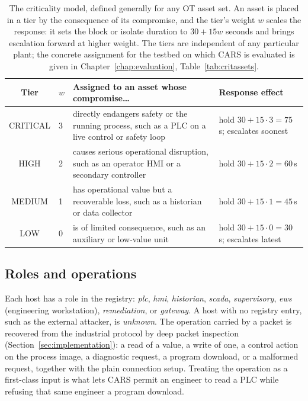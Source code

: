 \begin{table}[t]
\centering
\begin{tabular}{clp{}l}
\hline
Tier & $w$ & Assigned to an asset whose compromise\ldots & Response effect \\
\hline
CRITICAL & 3 & directly endangers safety or the running process, such as a PLC on a live control or safety loop & hold $30{+}15{\cdot}3=75$\,s; escalates soonest \\
HIGH & 2 & causes serious operational disruption, such as an operator HMI or a secondary controller & hold $30{+}15{\cdot}2=60$\,s \\
MEDIUM & 1 & has operational value but a recoverable loss, such as a historian or data collector & hold $30{+}15{\cdot}1=45$\,s \\
LOW & 0 & is of limited consequence, such as an auxiliary or low-value unit & hold $30{+}15{\cdot}0=30$\,s; escalates latest \\
\hline
\end{tabular}
\caption[The criticality model]{The criticality model, defined generally for any OT asset set. An asset is placed in a tier by the consequence of its compromise, and the tier's weight $w$ scales the response: it sets the block or isolate duration to $30+15w$ seconds and brings escalation forward at higher weight. The tiers are independent of any particular plant; the concrete assignment for the testbed on which CARS is evaluated is given in Chapter~\ref{chap:evaluation}, Table~\ref{tab:critassets}.}
\label{tab:criticality}
\end{table}

\subsection{Roles and operations}

Each host has a role in the registry: \emph{plc}, \emph{hmi}, \emph{historian}, \emph{scada}, \emph{supervisory}, \emph{ews} (engineering workstation), \emph{remediation}, or \emph{gateway}. A host with no registry entry, such as the external attacker, is \emph{unknown}. The operation carried by a packet is recovered from the industrial protocol by deep packet inspection (Section~\ref{sec:implementation}): a read of a value, a write of one, a control action on the process image, a diagnostic request, a program download, or a malformed request, together with the plain connection setup. Treating the operation as a first-class input is what lets CARS permit an engineer to read a PLC while refusing that same engineer a program download.

